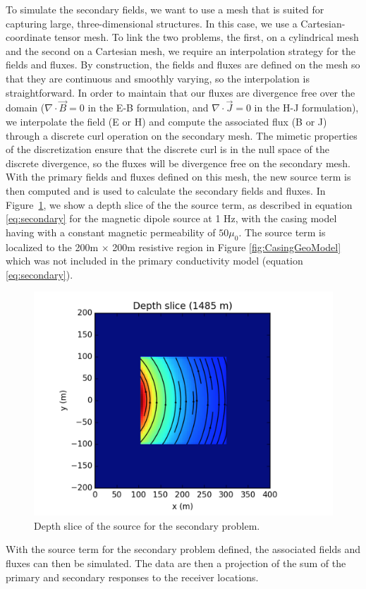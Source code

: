 \documentclass{segabs}
\renewcommand{\div}{\ensuremath{\nabla \cdot}}
\begin{document}
To simulate the secondary fields, we want to use a mesh that is suited for capturing large, three-dimensional structures. In this case, we use a Cartesian-coordinate tensor mesh. To link the two problems, the first, on a cylindrical mesh and the second on a Cartesian mesh, we require an interpolation strategy for the fields and fluxes. By construction, the fields and fluxes are defined on the mesh so that they are continuous and smoothly varying, so the interpolation is straightforward. In order to maintain that our fluxes are divergence free over the domain ($\div \vec{B} = 0$ in the E-B formulation, and $\div \vec{J} = 0$ in the H-J formulation), we interpolate the field (E or H) and compute the associated flux (B or J) through a discrete curl operation on the secondary mesh. The mimetic properties of the discretization ensure that the discrete curl is in the null space of the discrete divergence, so the fluxes will be divergence free on the secondary mesh. With the primary fields and fluxes defined on this mesh, the new source term is then computed and is used to calculate the secondary fields and fluxes. In Figure~\ref{fig:secondarySource}, we show a depth slice of the the source term, as described in equation \ref{eq:secondary} for the magnetic dipole source at 1 Hz, with the casing model having with a constant magnetic permeability of $50 \mu_0$. The source term is localized to the 200m $\times$ 200m resistive region in Figure \ref{fig:CasingGeoModel} which was not included in the primary conductivity model (equation \ref{eq:secondary}). 
\begin{figure}[h!]
	\centering
	\includegraphics[width=0.95\columnwidth]{./Figures/SecSource}
	\caption{Depth slice of the source for the secondary problem. }
	\label{fig:secondarySource}
\end{figure}
With the source term for the secondary problem defined, the associated fields and fluxes can then be simulated. The data are then a projection of the sum of the primary and secondary responses to the receiver locations. 
\end{document}
